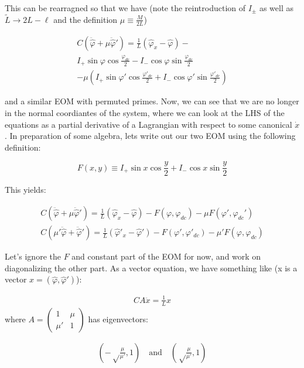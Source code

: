 \documentclass[paper=a4, twocolumn, fontsize=10pt]{article} %
\numberwithin{equation}{section} %
\numberwithin{figure}{section} %
\numberwithin{table}{section} %
\def \df#1{\hat{#1}}
\def \dl#1{#1}
\begin{document}
This can be rearragned so that we have (note the reintroduction of $I_{\pm}$ as well as $\tilde{L}\to 2L-\ell$ and the definition $\mu\equiv \frac{M}{2L}$)

\begin{multline}
    C \left(\ddot{\df\varphi}+ \mu \ddot{\df\varphi}' \right) = \frac{1}{L}\left( \df\varphi_x - \df\varphi \right) -  \\
    I_{+} \sin \dl\varphi \cos \frac{\dl\dl\varphi_{dc}}{2} - I_{-} \cos \dl\dl\varphi \sin \frac{\dl\dl\varphi_{dc}}{2} \\
    - \mu ( I_{+} \sin \dl\dl\varphi' \cos \frac{\dl\dl\varphi'_{dc}}{2} + I_{-} \cos \dl\dl\varphi' \sin \frac{\dl\dl\varphi'_{dc}}{2})
\end{multline}

and a similar EOM with permuted primes. Now, we can see that we are no longer in the normal coordiantes of the system, where we can look at the LHS of the equations as a partial derivative of a Lagrangian with respect to some canonical $\dot{x}$. In preparation of some algebra, lets write out our two EOM using the following definition:

\[ F(x,y) \equiv I_{+} \sin x \cos \frac{y}{2} + I_{-} \cos x \sin \frac{y}{2} \]

This yields:

\begin{align}
    C \left( \ddot{\df\varphi} + \mu \ddot{\df\varphi}'\right) = \frac{1}{L} (\df\varphi_x-\df\varphi) - F(\dl\varphi, \dl\varphi_{dc}) - \mu F(\dl\varphi',\dl\varphi_{dc}')
    \\
    C \left( \mu' \ddot{\df\varphi} + \ddot{\df\varphi}'\right) = \frac{1}{L} (\df\varphi'_x-\df\varphi') - F(\dl\varphi', \dl\varphi'_{dc}) - \mu' F(\dl\varphi,\dl\varphi_{dc})
\end{align}

Let's ignore the $F$ and constant part of the EOM for now, and work on diagonalizing the other part. As a vector equation, we have something like (x is a vector $x = (\df\varphi, \df\varphi')$):

\begin{align}{
    C A \ddot{x} = \frac{1}{L} x 
}
\end{align}
where $A = \begin{pmatrix} 1 & \mu \\ \mu' & 1 \end{pmatrix}  $ has eigenvectors:

\begin{align} \left(-\sqrt\frac{\mu}{\mu'}, 1\right) \quad \text{and} \quad \left(\sqrt\frac{\mu}{\mu'}, 1\right) \end{align}
 
\end{document}
